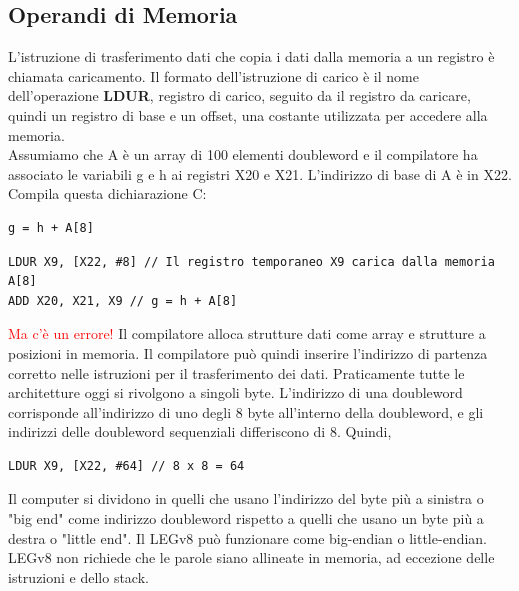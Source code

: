 \documentclass[12pt,a4paper]{article}
\begin{document}
\subsection{Operandi di Memoria}
L'istruzione di trasferimento dati che copia i dati dalla memoria a un registro è chiamata caricamento. Il formato dell'istruzione di carico è il nome dell'operazione \textbf{LDUR}, registro di carico, seguito da il registro da caricare, quindi un registro di base e un offset, una costante utilizzata per accedere alla memoria.\\
Assumiamo che A è un array di 100 elementi doubleword e il compilatore ha associato le variabili g e h ai registri X20 e X21. L'indirizzo di base di A è in X22.\\
Compila questa dichiarazione C:
\begin{center}
\begin{minipage}{.2\linewidth}
\begin{verbatim}
g = h + A[8]
\end{verbatim}
\end{minipage}
\end{center}
\begin{verbatim}
LDUR X9, [X22, #8] // Il registro temporaneo X9 carica dalla memoria A[8]
ADD X20, X21, X9 // g = h + A[8]
\end{verbatim}
\textcolor{red}{Ma c'è un errore!}
Il compilatore alloca strutture dati come array e strutture a posizioni in memoria. Il compilatore può quindi inserire l'indirizzo di partenza corretto nelle istruzioni per il trasferimento dei dati.  Praticamente tutte le architetture oggi si rivolgono a singoli byte. L'indirizzo di una doubleword corrisponde all'indirizzo di uno degli 8 byte all'interno della doubleword, e gli indirizzi delle doubleword sequenziali differiscono di 8.
Quindi, \begin{center}
\begin{minipage}{.4\linewidth}
\begin{verbatim}
LDUR X9, [X22, #64] // 8 x 8 = 64
\end{verbatim}
\end{minipage}
\end{center}
Il computer si dividono in quelli che usano l'indirizzo del byte più a sinistra o "big end" come indirizzo doubleword rispetto a quelli che usano un byte più a destra o "little end". Il LEGv8 può funzionare come big-endian o little-endian. LEGv8 non richiede che le parole siano allineate in memoria, ad eccezione delle istruzioni e dello stack.\\
\end{document}
